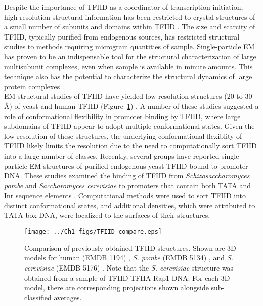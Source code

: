 Despite the importance of TFIID as a coordinator of transcription initiation, high-resolution structural information has been restricted to crystal structures of a small number of subunits and domains within TFIID \cite{Bhattacharya_1103,Jacobson_2160,Kim_3377,Kim_3416,Liu_2574,Werten_1763,Xie_2805}. The size and scarcity of TFIID, typically purified from endogenous sources, has restricted structural studies to methods requiring microgram quantities of sample. Single-particle EM has proven to be an indispensable tool for the structural characterization of large multisubunit complexes, even when sample is available in minute amounts. This technique also has the potential to characterize the structural dynamics of large protein complexes \cite{Leschziner_883}.\\
\indent EM structural studies of TFIID have yielded low-resolution structures (20 to 30 Å) of yeast and human TFIID (Figure~\ref{fig:Compare}) \cite{Andel_2407,Brand_2375,Elmlund_691,Grob_1281,Leurent_1554,Leurent_1797,Liu_574,Papai_418,Papai_539}. A number of these studies suggested a role of conformational flexibility in promoter binding by TFIID, where large subdomains of TFIID appear to adopt multiple conformational states. Given the low resolution of these structures, the underlying conformational flexiblity of TFIID likely limits the resolution due to the need to computationally sort TFIID into a large number of classes. Recently, several groups have reported single particle EM structures of purified endogenous yeast TFIID bound to promoter DNA. These studies examined the binding of TFIID from \emph{Schizosaccharomyces pombe} and \emph{Saccharomyces cerevisiae} to promoters that contain both TATA and Inr sequence elements \cite{Elmlund_691,Papai_539}. Computational methods were used to sort TFIID into distinct conformational states, and additional densities, which were attributed to TATA box DNA, were localized to the surfaces of their structures.\\
\begin{figure}
\centering
\texttt{[image: ../Ch1\_figs/TFIID\_compare.eps]}
\caption[Comparison of prevoiusly obtained TFIID structures]{Comparison of previously obtained TFIID structures. Shown are 3D models for human (EMDB 1194) \cite{Grob_1281}, \emph{S. pombe} (EMDB 5134) \cite{Elmlund_691}, and \emph{S. cerevisiae} (EMDB 5176) \cite{Papai_539}. Note that the  \emph{S. cerevisiae} structure was obtained from a sample of TFIID-TFIIA-Rap1-DNA. For each 3D model, there are corresponding projections shown alongside sub-classified averages.}
\label{fig:Compare}
\end{figure}
